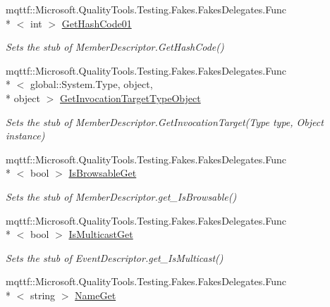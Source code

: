 \begin{DoxyCompactItemize}
mqttf\-::\-Microsoft.\-Quality\-Tools.\-Testing.\-Fakes.\-Fakes\-Delegates.\-Func\\*
$<$ int $>$ \hyperlink{class_system_1_1_component_model_1_1_fakes_1_1_stub_event_descriptor_afd984bf9f990e3b8613be3240a2c93ba}{Get\-Hash\-Code01}
\begin{DoxyCompactList}\small\item\em Sets the stub of Member\-Descriptor.\-Get\-Hash\-Code()\end{DoxyCompactList}\item 
mqttf\-::\-Microsoft.\-Quality\-Tools.\-Testing.\-Fakes.\-Fakes\-Delegates.\-Func\\*
$<$ global\-::\-System.\-Type, object, \\*
object $>$ \hyperlink{class_system_1_1_component_model_1_1_fakes_1_1_stub_event_descriptor_a3fa1d813fffed3126565511fa48cba38}{Get\-Invocation\-Target\-Type\-Object}
\begin{DoxyCompactList}\small\item\em Sets the stub of Member\-Descriptor.\-Get\-Invocation\-Target(\-Type type, Object instance)\end{DoxyCompactList}\item 
mqttf\-::\-Microsoft.\-Quality\-Tools.\-Testing.\-Fakes.\-Fakes\-Delegates.\-Func\\*
$<$ bool $>$ \hyperlink{class_system_1_1_component_model_1_1_fakes_1_1_stub_event_descriptor_a36a7b1c0a165425c6cf74dee629c5a14}{Is\-Browsable\-Get}
\begin{DoxyCompactList}\small\item\em Sets the stub of Member\-Descriptor.\-get\-\_\-\-Is\-Browsable()\end{DoxyCompactList}\item 
mqttf\-::\-Microsoft.\-Quality\-Tools.\-Testing.\-Fakes.\-Fakes\-Delegates.\-Func\\*
$<$ bool $>$ \hyperlink{class_system_1_1_component_model_1_1_fakes_1_1_stub_event_descriptor_a47e3994bafdf2954e94ee61f7f1b0feb}{Is\-Multicast\-Get}
\begin{DoxyCompactList}\small\item\em Sets the stub of Event\-Descriptor.\-get\-\_\-\-Is\-Multicast()\end{DoxyCompactList}\item 
mqttf\-::\-Microsoft.\-Quality\-Tools.\-Testing.\-Fakes.\-Fakes\-Delegates.\-Func\\*
$<$ string $>$ \hyperlink{class_system_1_1_component_model_1_1_fakes_1_1_stub_event_descriptor_a3e077c43857b9dd2b95f430bd2ce56cb}{Name\-Get}

\end{DoxyCompactItemize}

